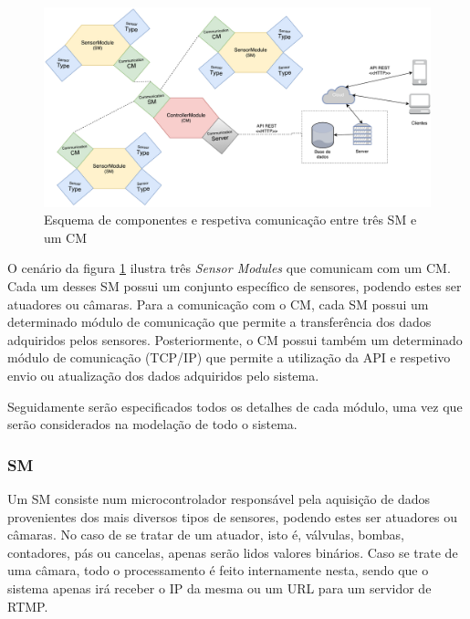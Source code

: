 \begin{figure}[h]
	\centering
	\includegraphics[width=0.95\linewidth]{esquemas/general-electronic-modules.pdf}
	\caption{Esquema de componentes e respetiva comunicação entre três \ac{SM} e um \ac{CM}}
	\label{esquema1}
\end{figure}

O cenário da figura \ref{esquema1} ilustra três \textit{Sensor Modules} que comunicam com um \acl{CM}. Cada um desses \acl{SM} possui um conjunto específico de sensores, podendo estes ser atuadores ou câmaras. Para a comunicação com o \acl{CM}, cada \acl{SM} possui um determinado módulo de comunicação que permite a transferência dos dados adquiridos pelos sensores. Posteriormente, o \acl{CM} possui também um determinado módulo de comunicação (\acs{TCP}/\acs{IP}) que permite a utilização da \ac{API} e respetivo envio ou atualização dos dados adquiridos pelo sistema. 





Seguidamente serão especificados todos os detalhes de cada módulo, uma vez que serão considerados na modelação de todo o sistema. 



\subsubsection{\acl{SM}}



Um \acl{SM} consiste num microcontrolador responsável pela aquisição de dados provenientes dos mais diversos tipos de sensores, podendo estes ser atuadores ou câmaras. No caso de se tratar de um atuador, isto é, válvulas, bombas, contadores, pás ou cancelas, apenas serão lidos valores binários. Caso se trate de uma câmara, todo o processamento é feito internamente nesta, sendo que o sistema apenas irá receber o \ac{IP} da mesma ou um \ac{URL} para um servidor de \ac{RTMP}.  


